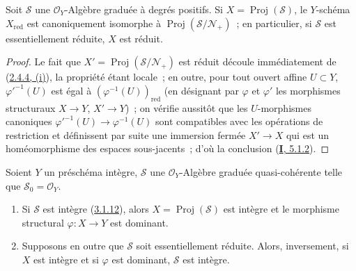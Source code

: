 \begin{proposition}[3.1.13]
\label{II.3.1.13-fr}
Soit $\mathcal{S}$ une $\mathcal{O}_Y$-Algèbre graduée à degrés positifs.
Si $X=\operatorname{Proj}(\mathcal{S})$, le $Y$-schéma $X_{\mathrm{red}}$ est
canoniquement isomorphe à $\operatorname{Proj}(\mathcal{S}/\mathcal{N}_+)$~;
en particulier, si $\mathcal{S}$ est essentiellement réduite, $X$ est réduit.
\end{proposition}

\begin{proof}
Le fait que $X'=\operatorname{Proj}(\mathcal{S}/\mathcal{N}_+)$ est réduit
découle immédiatement de (\hyperref[II.2.4.4-fr]{2.4.4, (i)}), la propriété
étant locale~; en outre, pour tout ouvert affine $U\subset Y$,
${\varphi'}^{-1}(U)$ est égal à $(\varphi^{-1}(U))_{\mathrm{red}}$ (en
désignant par $\varphi$ et $\varphi'$ les morphismes structuraux $X\to Y$,
$X'\to Y$)~; on vérifie aussitôt que les $U$-morphismes canoniques
${\varphi'}^{-1}(U)\to\varphi^{-1}(U)$ sont compatibles avec les opérations
de restriction et définissent par suite une immersion fermée $X'\to X$ qui
est un homéomorphisme des espaces sous-jacents~; d'où la conclusion
(\hyperref[I.5.1.2-fr]{\textbf{I}, 5.1.2}).
\end{proof}

\begin{proposition}[3.1.14]
\label{II.3.1.14-fr}
Soient $Y$ un préschéma intègre, $\mathcal{S}$ une
$\mathcal{O}_Y$-Algèbre graduée quasi-cohérente telle que
$\mathcal{S}_0=\mathcal{O}_Y$.
\begin{enumerate}
  \item[\rm(i)] Si $\mathcal{S}$ est intègre
    \textup{(\hyperref[II.3.1.12-fr]{3.1.12})}, alors
    $X=\operatorname{Proj}(\mathcal{S})$ est intègre et le morphisme
    structural $\varphi:X\to Y$ est dominant.
  \item[\rm(ii)] Supposons en outre que $\mathcal{S}$ soit essentiellement
    réduite. Alors, inversement, si $X$ est intègre et si $\varphi$ est
    dominant, $\mathcal{S}$ est intègre.
\end{enumerate}
\end{proposition}

